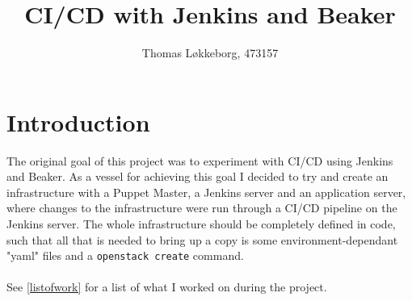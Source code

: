 

\title{CI/CD with Jenkins and Beaker}
\author{Thomas Løkkeborg, 473157} %



\maketitle


\thispagestyle{empty}

\clearpage
{}
\setcounter{page}{1}
\tableofcontents

\clearpage
{}

\section{Introduction}

The original goal of this project was to experiment with CI/CD using Jenkins and Beaker. As a vessel for achieving this goal I decided to try and create an infrastructure with a Puppet Master, a Jenkins server and an application server, where changes to the infrastructure were run through a CI/CD pipeline on the Jenkins server. The whole infrastructure should be completely defined in code, such that all that is needed to bring up a copy is some environment-dependant "yaml" files and a \texttt{openstack create} command.
\\
\\
See \ref{listofwork} for a list of what I worked on during the project.

